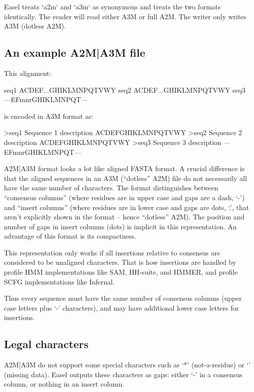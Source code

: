 
Easel treats `a2m` and `a3m` as synonymous and treats the two formats
identically. The reader will read either A3M or full A2M. The writer
only writes A3M (dotless A2M).

\subsection{An example A2M|A3M file}

This alignment:

\begin{sreoutput}
seq1  ACDEF...GHIKLMNPQTVWY
seq2  ACDEF...GHIKLMNPQTVWY
seq3  ---EFmnrGHIKLMNPQT---
\end{sreoutput}

\noindent 
is encoded in A3M format as:

\begin{sreoutput}
>seq1  Sequence 1 description
ACDEFGHIKLMNPQTVWY
>seq2  Sequence 2 description
ACDEFGHIKLMNPQTVWY
>seq3  Sequence 3 description
---EFmnrGHIKLMNPQT---
\end{sreoutput}

A2M|A3M format looks a lot like aligned FASTA format. A crucial difference
is that the aligned sequences in an A3M (``dotless'' A2M) file do not
necessarily all have the same number of characters. The format
distinguishes between ``consensus columns'' (where residues are in
upper case and gaps are a dash, `-') and ``insert columns'' (where
residues are in lower case and gaps are dots, `.', that aren't
explicitly shown in the format -- hence ``dotless'' A2M). The position
and number of gaps in insert columns (dots) is implicit in this
representation.  An advantage of this format is its compactness.

This representation only works if all insertions relative to consensus
are considered to be unaligned characters. That is how insertions are
handled by profile HMM implementations like SAM, HH-suite, and HMMER,
and profile SCFG implementations like Infernal.

Thus every sequence must have the same number of consensus columns
(upper case letters plus `-' characters), and may have additional lower
case letters for insertions.

\subsection{Legal characters}

A2M|A3M do not support some special characters such as `*'
(not-a-residue) or `\mono{\~}' (missing data). Easel outputs these
characters as gaps: either `-' in a consensus column, or nothing in an
insert column.

